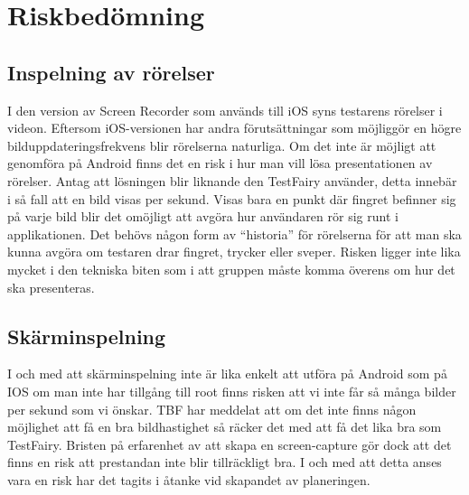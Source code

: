 \section{Riskbedömning}

\subsection{Inspelning av rörelser}
I den version av Screen Recorder som används till iOS syns testarens rörelser i videon. Eftersom iOS-versionen har andra förutsättningar som möjliggör en högre bilduppdateringsfrekvens blir rörelserna naturliga. Om det inte är möjligt att genomföra på Android finns det en risk i hur man vill lösa presentationen av rörelser. Antag att lösningen blir liknande den TestFairy använder, detta innebär i så fall att en bild visas per sekund. Visas bara en punkt där fingret befinner sig på varje bild blir det omöjligt att avgöra hur användaren rör sig runt i applikationen. Det behövs någon form av ``historia'' för rörelserna för att man ska kunna avgöra om testaren drar fingret, trycker eller sveper. Risken ligger inte lika mycket i den tekniska biten som i att gruppen måste komma överens om hur det ska presenteras.

\subsection{Skärminspelning}
I och med att skärminspelning inte är lika enkelt att utföra på Android som på IOS om man inte har tillgång till root finns risken att vi inte får så många bilder per sekund som vi önskar. TBF har meddelat att om det inte finns någon möjlighet att få en bra bildhastighet så räcker det med att få det lika bra som TestFairy. Bristen på erfarenhet av att skapa en screen-capture gör dock att det finns en risk att prestandan inte blir tillräckligt bra. I och med att detta anses vara en risk har det tagits i åtanke vid skapandet av planeringen.